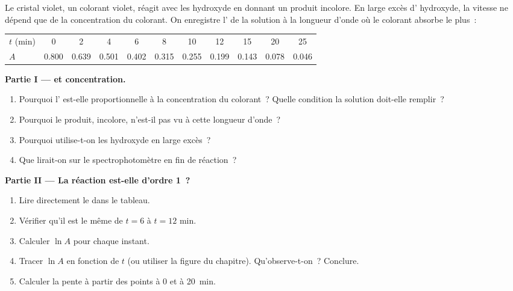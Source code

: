 \begin{problem}
\label{pb:g12:reaction-rates:1}
Le cristal violet, un colorant violet, réagit avec les  hydroxyde en
donnant un produit incolore. En large excès d' hydroxyde, la vitesse
ne dépend que de la concentration du colorant. On enregistre
l' de la solution à la longueur d'onde où le colorant absorbe
le plus~:
\begin{center}
\small
\begin{tabular}{l*{10}{c}}
\hline
$t$ (\si{min}) & 0 & 2 & 4 & 6 & 8 & 10 & 12 & 15 & 20 & 25 \\
$A$ & 0.800 & 0.639 & 0.501 & 0.402 & 0.315 & 0.255 & 0.199 & 0.143 &
0.078 & 0.046 \\
\hline
\end{tabular}
\end{center}

\medskip
\noindent\textbf{Partie I ---  et concentration.}
\begin{enumerate}
  \item Pourquoi l' est-elle proportionnelle à la
        concentration du colorant~? Quelle condition la solution doit-elle
        remplir~?
  \item Pourquoi le produit, incolore, n'est-il pas vu à cette longueur
        d'onde~?
  \item Pourquoi utilise-t-on les  hydroxyde en large excès~?
  \item Que lirait-on sur le spectrophotomètre en fin de réaction~?
\end{enumerate}

\medskip
\noindent\textbf{Partie II --- La réaction est-elle d'ordre 1~?}
\begin{enumerate}[resume]
  \item Lire directement le  dans le tableau.
  \item Vérifier qu'il est le même de $t = 6$ à $t = 12$ min.
  \item Calculer $\ln A$ pour chaque instant.
  \item Tracer $\ln A$ en fonction de $t$ (ou utiliser la figure du
        chapitre). Qu'observe-t-on~? Conclure.
  \item Calculer la pente à partir des points à 0 et à \qty{20}{min}.
\end{enumerate}


\end{problem}
